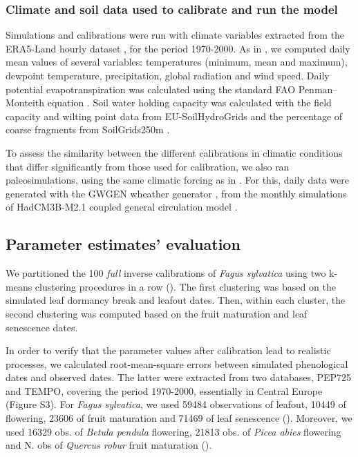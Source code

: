 \documentclass[letterpaper,8pt]{extarticle}  %
\begin{document}
\begin{doublespacing}
\begin{linenumbers}
\subsubsection{Climate and soil data used to calibrate and run the model}

Simulations and calibrations were run with climate variables extracted from the ERA5-Land hourly dataset \citep{MunozSabater2021}, for the period 1970-2000. As in \citet{VanderMeersch2023}, we computed daily mean values of several variables: temperatures (minimum, mean and maximum), dewpoint temperature, precipitation, global radiation and wind speed. Daily potential evapotranspiration was calculated using the standard FAO Penman–Monteith equation \citep{Allen1998}. Soil water holding capacity was calculated with the field capacity and wilting point data from EU-SoilHydroGrids \citep{Toth2017} and the percentage of coarse fragments from SoilGrids250m \citep{Hengl2017}.

To assess the similarity between the different calibrations in climatic conditions that differ significantly from those used for calibration, we also ran paleosimulations, using the same climatic forcing as in \citet{VanderMeersch2024}. For this, daily data were generated with the GWGEN wheather generator \citep{Sommer2017}, from the monthly simulations of HadCM3B-M2.1 coupled general circulation model \citep{Armstrong2019}.

\subsection{Parameter estimates' evaluation}

We partitioned the 100 \emph{full} inverse calibrations of \emph{Fagus sylvatica} using two k-means clustering procedures in a row (). The first clustering was based on the simulated leaf dormancy break and leafout dates. Then, within each cluster, the second clustering was computed based on the fruit maturation and leaf senescence dates.

In order to verify that the parameter values after calibration lead to realistic processes, we calculated root-mean-square errors between simulated phenological dates and observed dates. The latter were extracted from two databases, PEP725 and TEMPO, covering the period 1970-2000, essentially in Central Europe (Figure S3). For \emph{Fagus sylvatica}, we used 59484 observations of leafout, 10449 of flowering, 23606 of fruit maturation and 71469 of leaf senescence (). Moreover, we used 16329 obs. of \emph{Betula pendula} flowering, 21813 obs. of \emph{Picea abies} flowering and N. obs of \emph{Quercus robur} fruit maturation ().


\end{linenumbers}
\end{doublespacing}
\end{document}
